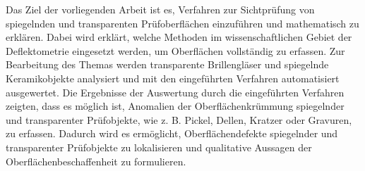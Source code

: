 \noindent
Das Ziel der vorliegenden Arbeit ist es, Verfahren zur Sichtprüfung von spiegelnden und transparenten Prüfoberflächen einzuführen und mathematisch zu erklären.
Dabei wird erklärt, welche Methoden im wissenschaftlichen Gebiet der Deflektometrie eingesetzt werden, um Oberflächen vollständig zu erfassen.
Zur Bearbeitung des Themas werden transparente Brillengläser und spiegelnde Keramikobjekte analysiert und mit den eingeführten Verfahren automatisiert ausgewertet.
Die Ergebnisse der Auswertung durch die eingeführten Verfahren zeigten, dass es möglich ist, Anomalien der Oberflächenkrümmung spiegelnder und transparenter Prüfobjekte, wie z. B. Pickel, Dellen, Kratzer oder Gravuren, zu erfassen.
Dadurch wird es ermöglicht, Oberflächendefekte spiegelnder und transparenter Prüfobjekte zu lokalisieren und qualitative Aussagen der Oberflächenbeschaffenheit zu formulieren.
